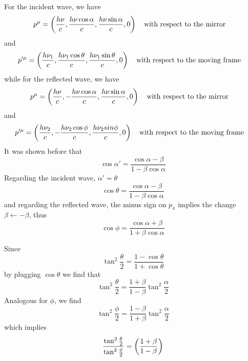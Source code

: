 \documentclass[oneside, 10pt, notitlepage]{book}
\begin{document}
For the incident wave, we have
\begin{equation}
    p^{\mu} = \lr{\frac{h\nu}{c},\frac{h\nu\cos \alpha}{c},\frac{h\nu\sin \alpha}{c},0 } \qq{with respect to the mirror}
\end{equation}
and
\begin{equation}
    p'^{\mu} = \lr{\frac{h\nu_1}{c},\frac{h\nu_1\cos \theta}{c},\frac{h\nu_1\sin \theta}{c},0 } \qq{with respect to the moving frame}
\end{equation}
while for the reflected wave, we have
\begin{equation}
    p^{\mu} = \lr{\frac{h\nu}{c},-\frac{h\nu\cos \alpha}{c},\frac{h\nu\sin \alpha}{c},0 } \qq{with respect to the mirror}
\end{equation}
and
\begin{equation}
    p'^{\mu} = \lr{\frac{h\nu_2}{c},-\frac{h\nu_2\cos \phi}{c},\frac{h\nu_2sin \phi}{c},0 } \qq{with respect to the moving frame}
\end{equation}
It was shown before that
\begin{equation}
    \cos \alpha'= \frac{\cos \alpha - \beta}{1 - \beta \cos \alpha}
\end{equation}
Regarding the incident wave, \(\alpha' = \theta\)
\begin{equation}
    \cos \theta = \frac{\cos \alpha - \beta}{1 - \beta \cos \alpha}
\end{equation}
and regarding the reflected wave, the minus sign on \(p_x\) implies the change \(\beta \leftarrow -\beta\), thus
\begin{equation}
    \cos\phi = \frac{\cos \alpha + \beta}{1 + \beta \cos \alpha}
\end{equation}

Since 
\begin{equation}
    \tan^2 \frac{\theta}{2} = \frac{1-\cos \theta}{1+\cos \theta}
\end{equation}
by plugging \(\cos\theta\) we find that
\begin{equation}
    \tan^2 \frac{\theta}{2} = \frac{1+\beta}{1-\beta} \tan^2 \frac{\alpha}{2}
\end{equation}
Analogous for \(\phi\), we find
\begin{equation}
    \tan^2\frac{\phi}{2} = \frac{1-\beta}{1+\beta} \tan^2 \frac{\alpha}{2}
\end{equation}
which implies
\begin{equation}
    \frac{\tan^2 \frac{\theta}{2}}{\tan^2\frac{\phi}{2}} = \left(\frac{1+\beta}{1-\beta}\right)
\end{equation}
\end{document}
